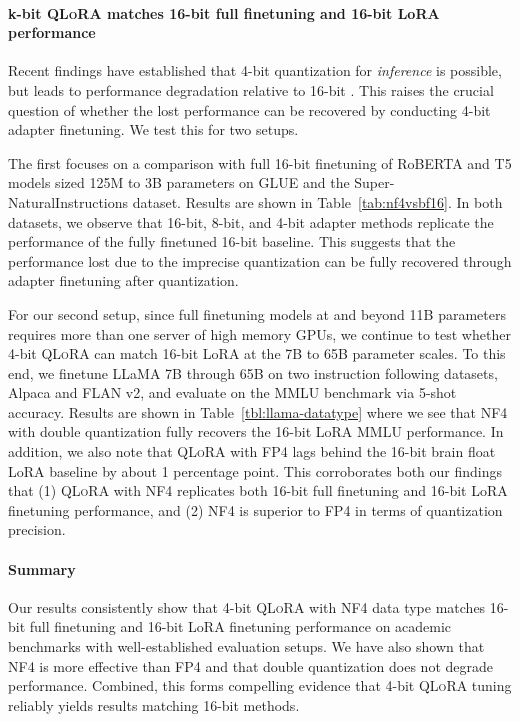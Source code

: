 \paragraph{k-bit \textsc{QLoRA} matches 16-bit full finetuning and 16-bit LoRA performance} Recent findings have established that 4-bit quantization for \emph{inference} is possible, but leads to performance degradation relative to 16-bit \citep{dettmers2022case,frantar2022gptq}. This raises the crucial question of whether the lost performance can be recovered by conducting 4-bit adapter finetuning. We test this for two setups. 

The first focuses on a comparison with full 16-bit finetuning of RoBERTA and T5 models sized 125M to 3B parameters on GLUE and the Super-NaturalInstructions dataset. Results are shown in Table~\ref{tab:nf4vsbf16}. In both datasets, we observe that 16-bit, 8-bit, and 4-bit adapter methods replicate the performance of the fully finetuned 16-bit baseline. This suggests that the performance lost due to the imprecise quantization can be fully recovered through adapter finetuning after quantization.

For our second setup, since full finetuning models at and beyond 11B parameters requires more than one server of high memory GPUs, we continue to test whether 4-bit \textsc{QLoRA} can match 16-bit LoRA at the 7B to 65B parameter scales. To this end, we finetune LLaMA 7B through 65B on two instruction following datasets, Alpaca and FLAN v2, and evaluate on the MMLU benchmark via 5-shot accuracy. Results are shown in Table~\ref{tbl:llama-datatype} where we see that NF4 with double quantization fully recovers the 16-bit LoRA MMLU performance. In addition, we also note that \textsc{QLoRA} with FP4 lags behind the 16-bit brain float LoRA baseline by about 1 percentage point. This corroborates both our findings that (1) \textsc{QLoRA} with NF4 replicates both 16-bit full finetuning and 16-bit LoRA finetuning performance, and (2) NF4 is superior to FP4 in terms of quantization precision.

\paragraph{Summary} Our results consistently show that 4-bit \textsc{QLoRA} with NF4 data type matches 16-bit full finetuning and 16-bit LoRA finetuning performance on academic benchmarks with well-established evaluation setups. We have also shown that NF4 is more effective than FP4 and that double quantization does not degrade performance. Combined, this forms compelling evidence that 4-bit \textsc{QLoRA} tuning reliably yields results matching 16-bit methods. 

